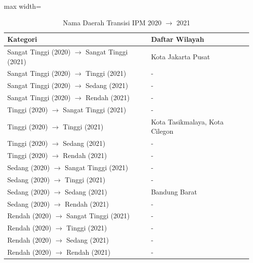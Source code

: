 \begin{table}[H]
\centering
\caption{Nama Daerah Transisi IPM 2020 \(\rightarrow\) 2021} \label{tab:ipmname2020x2021}
\begin{adjustbox}{max width=\textwidth}
\begin{tabular}{|p{4cm}|p{10cm}|}
\hline
\textbf{Kategori} & \textbf{Daftar Wilayah} \\
\hline
Sangat Tinggi (2020) \(\rightarrow\) Sangat Tinggi (2021) & Kota Jakarta Pusat \\
\hline
Sangat Tinggi (2020) \(\rightarrow\) Tinggi (2021) & - \\
\hline
Sangat Tinggi (2020) \(\rightarrow\) Sedang (2021) & - \\
\hline
Sangat Tinggi (2020) \(\rightarrow\) Rendah (2021) & - \\
\hline
Tinggi (2020) \(\rightarrow\) Sangat Tinggi (2021) & - \\
\hline
Tinggi (2020) \(\rightarrow\) Tinggi (2021) & Kota Tasikmalaya, Kota Cilegon \\
\hline
Tinggi (2020) \(\rightarrow\) Sedang (2021) & - \\
\hline
Tinggi (2020) \(\rightarrow\) Rendah (2021) & - \\
\hline
Sedang (2020) \(\rightarrow\) Sangat Tinggi (2021) & - \\
\hline
Sedang (2020) \(\rightarrow\) Tinggi (2021) & - \\
\hline
Sedang (2020) \(\rightarrow\) Sedang (2021) & Bandung Barat \\
\hline
Sedang (2020) \(\rightarrow\) Rendah (2021) & - \\
\hline
Rendah (2020) \(\rightarrow\) Sangat Tinggi (2021) & - \\
\hline
Rendah (2020) \(\rightarrow\) Tinggi (2021) & - \\
\hline
Rendah (2020) \(\rightarrow\) Sedang (2021) & - \\
\hline
Rendah (2020) \(\rightarrow\) Rendah (2021) & - \\
\hline
\end{tabular}
\end{adjustbox}
\end{table}